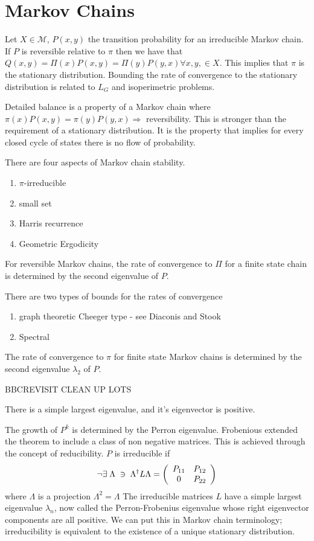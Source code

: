 \section{Markov Chains}
Let $X \in \mathcal{M}$, $P(x,y)$ the transition probability for an irreducible Markov chain. If $P$ is reversible relative to $\pi$ then we have that $Q(x,y) = \Pi(x) P(x,y) =\Pi(y) P(y,x) \forall x,y, \in X$.  This implies that $\pi$ is the stationary distribution.  Bounding the rate of convergence to the stationary distribution is related to $L_G$ and isoperimetric problems.

Detailed balance is a property of a Markov chain where $\pi(x) P(x,y) =\pi(y) P(y,x) \Rightarrow$ reversibility.  This is stronger than the requirement of a stationary distribution.  It is the property that implies for every closed cycle of states there is no flow of probability.

There are four aspects of Markov chain stability.
\begin{enumerate}
\item $\pi$-irreducible
\item small set
\item Harris recurrence
\item Geometric Ergodicity
\end{enumerate}

For reversible Markov chains, the rate of convergence to $\Pi$ for a finite state chain is determined by the second eigenvalue of $P$.

There are two types of bounds for the rates of convergence
\begin{enumerate}
\item graph theoretic Cheeger type - see Diaconis and Stook
\item Spectral
\end{enumerate}
The rate of convergence to $\pi$ for finite state Markov chains is determined by the second eigenvalue $\lambda_2$ of $P$.

BBCREVISIT CLEAN UP LOTS
\begin{thm}
There is a simple largest eigenvalue, and it's eigenvector is positive.

\end{thm}
The growth of $P^k$ is determined by the Perron eigenvalue.  Frobenious extended the theorem to include a class of non negative matrices.  This is achieved through the concept of reducibility.  $P$ is irreducible if
\begin{equation*}
\neg \exists \; \Lambda \; \ni \;\Lambda^\dag L \Lambda =
 \left( \begin{array}{cc}
P_{11} & P_{12}  \\
0 & P_{22} \end{array} \right)
\end{equation*}
where $\Lambda$ is a projection $\Lambda^2 = \Lambda$
The irreducible matrices $L$ have a simple largest eigenvalue $\lambda_n$, now called the Perron-Frobenius eigenvalue whose right eigenvector components are all positive.  We can put this in Markov chain terminology; irreducibility is equivalent to the existence of a unique stationary distribution.

